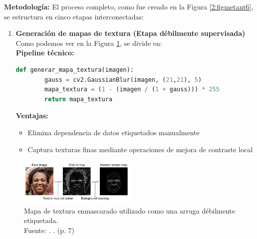 \textbf{Metodología:}
El proceso completo, como fue creado en la Figura \ref{2:figmetant6}, se estructura en cinco etapas interconectadas:

\begin{enumerate}
    \item \textbf{Generación de mapas de textura (Etapa débilmente supervisada)}
    Como podemos ver en la Figura \ref{2:figtextmap}, se divide en:
\\
	\textbf{Pipeline técnico:}
    \begin{lstlisting}[language=Python, basicstyle=\ttfamily\footnotesize]
    def generar_mapa_textura(imagen):
        gauss = cv2.GaussianBlur(imagen, (21,21), 5)
        mapa_textura = (1 - (imagen / (1 + gauss))) * 255
        return mapa_textura
    \end{lstlisting}
    \textbf{Ventajas:}
    \begin{itemize}[label=$\bullet$, leftmargin=1em]
        \item Elimina dependencia de datos etiquetados manualmente
        \item Captura texturas finas mediante operaciones de mejora de contraste local
    \end{itemize}
\end{enumerate}

	\begin{figure}[H]
		\begin{center}
			\includegraphics[width=0.5\textwidth]{2/figures/texturemap.png}
			\caption[Mapa de textura enmascarado utilizado como una arruga débilmente etiquetada]{Mapa de textura enmascarado utilizado como una arruga débilmente etiquetada.\\
				Fuente: \cite{moon2024dermatology}. . (p. 7)}
			\label{2:figtextmap}
		\end{center}
	\end{figure}	

